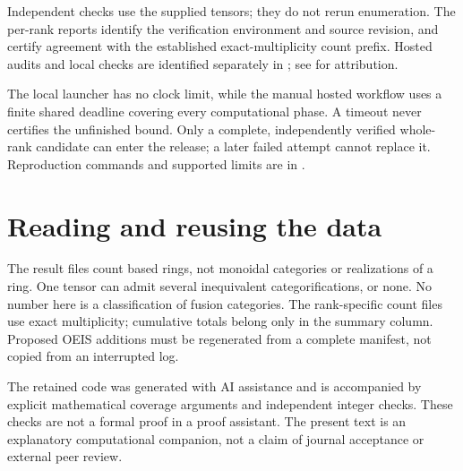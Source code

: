 \documentclass[11pt,a4paper]{article}
\theoremstyle{definition}\newtheorem{definition}[theorem]{Definition}\newtheorem{remark}[theorem]{Remark}
\begin{document}
Independent checks use the supplied tensors; they do not rerun enumeration.
The per-rank reports identify the verification environment and source revision,
and certify agreement with the established exact-multiplicity count prefix.
Hosted audits and local checks are identified separately in
; see  for attribution.

The local launcher has no clock limit, while the manual hosted workflow uses a
finite shared deadline covering every computational phase. A timeout never
certifies the unfinished bound. Only a complete, independently verified whole-rank
candidate can enter the release; a later failed attempt cannot replace it.
Reproduction commands and supported limits are in .

\section{Reading and reusing the data}
The result files count based rings, not monoidal categories or realizations of
a ring. One tensor can admit several inequivalent categorifications, or none.
No number here is a classification of fusion categories. The rank-specific
count files use exact multiplicity; cumulative totals belong only in the
summary column. Proposed OEIS additions must be regenerated from a complete
manifest, not copied from an interrupted log.

The retained code was generated with AI assistance and is accompanied by explicit
mathematical coverage arguments and independent integer checks. These checks
are not a formal proof in a proof assistant. The present text is an explanatory
computational companion, not a claim of journal acceptance or external peer review.
\end{document}
